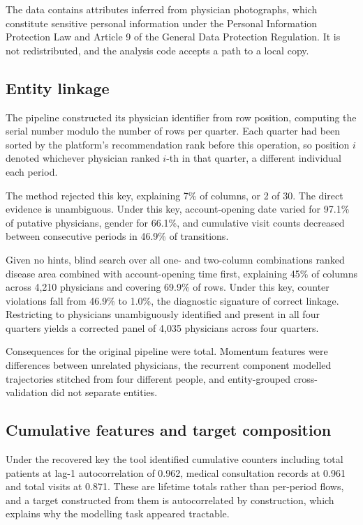 \documentclass[preprint,12pt]{elsarticle}
\begin{document}
The data contains attributes inferred from physician photographs, which
constitute sensitive personal information under the Personal Information
Protection Law and Article 9 of the General Data Protection Regulation. It is
not redistributed, and the analysis code accepts a path to a local copy.

\subsection{Entity linkage}

The pipeline constructed its physician identifier from row position, computing
the serial number modulo the number of rows per quarter. Each quarter had been
sorted by the platform's recommendation rank before this operation, so position
$i$ denoted whichever physician ranked $i$-th in that quarter, a different
individual each period.

The method rejected this key, explaining 7\% of columns, or 2 of 30. The direct
evidence is unambiguous. Under this key, account-opening date varied for 97.1\%
of putative physicians, gender for 66.1\%, and cumulative visit counts decreased
between consecutive periods in 46.9\% of transitions.

Given no hints, blind search over all one- and two-column combinations ranked
disease area combined with account-opening time first, explaining 45\% of
columns across 4{,}210 physicians and covering 69.9\% of rows. Under this key,
counter violations fall from 46.9\% to 1.0\%, the diagnostic signature of
correct linkage. Restricting to physicians unambiguously identified and present
in all four quarters yields a corrected panel of 4{,}035 physicians across four
quarters.

Consequences for the original pipeline were total. Momentum features were
differences between unrelated physicians, the recurrent component modelled
trajectories stitched from four different people, and entity-grouped
cross-validation did not separate entities.

\subsection{Cumulative features and target composition}

Under the recovered key the tool identified cumulative counters including total
patients at lag-1 autocorrelation of 0.962, medical consultation records at
0.961 and total visits at 0.871. These are lifetime totals rather than
per-period flows, and a target constructed from them is autocorrelated by
construction, which explains why the modelling task appeared tractable.
\end{document}
